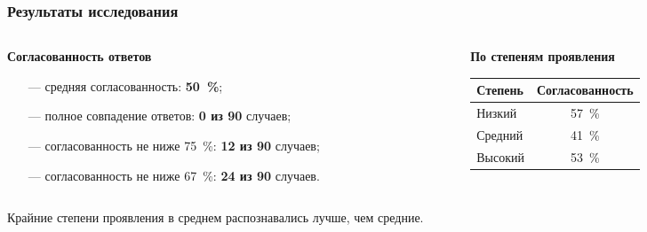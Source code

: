 \documentclass{beamer}
\begin{document}
\begin{frame}
    \frametitle{Результаты исследования}
    \begin{columns}[T,onlytextwidth]
        \begin{column}{0.48\textwidth}
            \textbf{Согласованность ответов}
            \vspace{0.15cm}
            \begin{itemize}
                \item[---] средняя согласованность: \textbf{50~\%};
                \item[---] полное совпадение ответов: \textbf{0 из 90} случаев;
                \item[---] согласованность не ниже 75~\%: \textbf{12 из 90} случаев;
                \item[---] согласованность не ниже 67~\%: \textbf{24 из 90} случаев.
            \end{itemize}
        \end{column}
        \begin{column}{0.48\textwidth}
            \textbf{По степеням проявления}
            \vspace{0.15cm}
            \begin{center}
                \renewcommand{\arraystretch}{1.25}
                \begin{tabular}{|l|c|}
                    \hline
                    \textbf{Степень} & \textbf{Согласованность} \\
                    \hline
                    Низкий & 57~\% \\
                    \hline
                    Средний & 41~\% \\
                    \hline
                    Высокий & 53~\% \\
                    \hline
                \end{tabular}
            \end{center}

        \end{column}
    \end{columns}

    \vfill
    Крайние степени проявления в среднем распознавались лучше, чем средние.
\end{frame}
\end{document}
